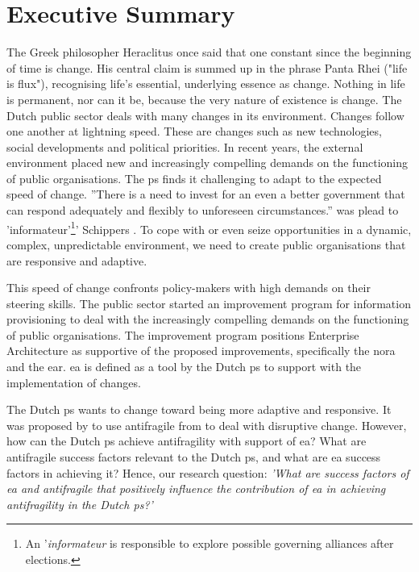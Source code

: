 \chapter*{Executive Summary}
\label{executivesummary}
The Greek philosopher Heraclitus once said that one constant since the beginning of time is change. His central claim is summed up in the phrase Panta Rhei ("life is flux"), recognising life's essential, underlying essence as change. Nothing in life is permanent, nor can it be, because the very nature of existence is change. The Dutch public sector deals with many changes in its environment. Changes follow one another at lightning speed. These are changes such as new technologies, social developments and political priorities. In recent years, the external environment placed new and increasingly compelling demands on the functioning of public organisations. The \gls{ps} finds it challenging to adapt to the expected speed of change. ''There is a need to invest for an even a better government that can respond adequately and flexibly to unforeseen circumstances.'' was plead to 'informateur'\footnote{An '\textit{informateur} is responsible to explore possible governing alliances after elections.}' Schippers \parencite{Secretarissen-generaal2018}. To cope with or even seize opportunities in a dynamic, complex, unpredictable environment, we need to create public organisations that are responsive and adaptive.

This speed of change confronts policy-makers with high demands on their steering skills. The public sector started an improvement program for information provisioning to deal with the increasingly compelling demands on the functioning of public organisations. The improvement program positions Enterprise Architecture as supportive of the proposed improvements, specifically the \acrfull{nora} and the \acrfull{ear}. \gls{ea} is defined as a tool by the Dutch \gls{ps} to support with the implementation of changes.

The Dutch \gls{ps} wants to change toward being more adaptive and responsive. It was proposed by \textcite{Steen2018} to use \gls{antifragile} from \textcite{Taleb2012} to deal with disruptive change.  However, how can the Dutch \gls{ps} achieve \gls{antifragility} with support of \gls{ea}? What are \gls{antifragile} success factors relevant to the Dutch \gls{ps}, and what are \gls{ea} success factors in achieving it? Hence, our research question: \emph{'What are success factors of \gls{ea} and \gls{antifragile} that positively influence the contribution of \gls{ea} in achieving \gls{antifragility} in the Dutch \gls{ps}?'}

